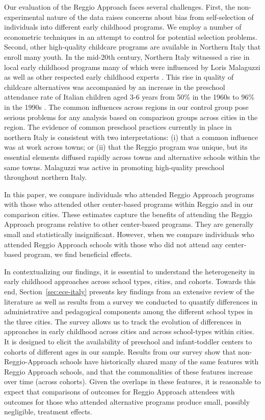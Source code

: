 Our evaluation of the Reggio Approach faces several challenges. First, the non-experimental nature of the data raises concerns about bias from self-selection of individuals into different early childhood programs. We employ a number of econometric techniques in an attempt to control for potential selection problems. Second, other high-quality childcare programs are available in Northern Italy that enroll many youth. In the mid-20th century, Northern Italy witnessed a rise in local early childhood programs many of which were influenced by Loris Malaguzzi as well as other respected early childhood experts \citep{OECD_2001_Italy-Country-Note}. This rise in quality of childcare alternatives was accompanied by an increase in the preschool attendance rate of Italian children aged 3-6 years from 50\% in the 1960s to 96\% in the 1990s \citep{Hohnerlein_2015_Development-and-Diffusion}. The common influences across regions in our control group pose serious problems for any analysis based on comparison groups across cities in the region.  The evidence of common preschool practices currently in place in northern Italy is consistent with two interpretations: (i) that a common influence was at work across towns; or (ii) that the Reggio program was unique, but its essential elements diffused rapidly across towns and alternative schools within the same towns. Malaguzzi was active in promoting high-quality preschool throughout northern Italy.

In this paper, we compare individuals who attended Reggio Approach programs with those who attended other center-based programs within Reggio and in our comparison cities. These estimates capture the benefits of attending the Reggio Approach programs relative to other center-based programs. They are generally small and statistically insignificant. However, when we compare individuals who attended Reggio Approach schools with those who did not attend any center-based program, we find beneficial effects.

In contextualizing our findings, it is essential to understand the heterogeneity in early childhood approaches across school types, cities, and cohorts. Towards this end, Section~\ref{sec:ece-italy} presents key findings from an extensive review of the literature as well as results from a survey we conducted to quantify differences in administrative and pedagogical components among the different school types in the three cities. The survey allows us to track the evolution of differences in approaches in early childhood across cities and across school-types within cities. It is designed to elicit the availability of preschool and infant-toddler centers to cohorts of different ages in our sample. Results from our survey show that non-Reggio-Approach schools have historically shared many of the same features with Reggio Approach schools, and that the commonalities of these features increase over time (across cohorts). Given the overlaps in these features, it is reasonable to expect that comparisons of outcomes for Reggio Approach attendees with outcomes for those who attended alternative programs produce small, possibly negligible, treatment effects.

